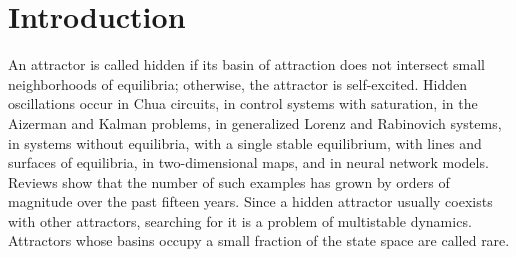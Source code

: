 \section{Introduction}\label{sec:intro}

An attractor is called hidden if its basin of attraction does not intersect small neighborhoods of equilibria; otherwise, the attractor is self-excited.\cite{LeonovKuznetsov2013,Leonov2011PLA,Kuznetsov2020JCSSI} Hidden oscillations occur in Chua circuits,\cite{Leonov2012PhysD,Stankevich2017,Kuznetsov2023Chua} in control systems with saturation,\cite{Andrievsky2017Aircraft} in the Aizerman and Kalman problems,\cite{Bragin2011} in generalized Lorenz and Rabinovich systems,\cite{Chen2017OnePath,Kuznetsov2018Rabinovich,Kuznetsov2020Lorenz} in systems without equilibria,\cite{JafariSprottGolpayegani2013,Wei2011} with a single stable equilibrium,\cite{WangChen2012,Molaie2013} with lines and surfaces of equilibria,\cite{JafariSprott2013,Jafari2016Surfaces} in two-dimensional maps,\cite{Jiang2016Maps,WangDing2018Map,Huynh2019} and in neural network models.\cite{DancaKuznetsov2017Hopfield} Reviews\cite{Dudkowski2016,JafariSprottNazarimehr2015,GuanXie2025} show that the number of such examples has grown by orders of magnitude over the past fifteen years. Since a hidden attractor usually coexists with other attractors, searching for it is a problem of multistable dynamics.\cite{Feudel2008,PisarchikFeudel2014} Attractors whose basins occupy a small fraction of the state space are called rare.\cite{Chudzik2011Rare,Yue2021RareDuffing}

